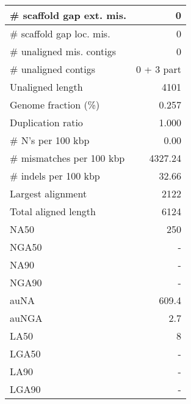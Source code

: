 \documentclass[12pt,a4paper]{article}
\begin{document}
\begin{table}[ht]
\begin{center}
\begin{tabular}{|l*{1}{|r}|}
\# scaffold gap ext. mis. & 0 \\ \hline
\# scaffold gap loc. mis. & 0 \\ \hline
\# unaligned mis. contigs & 0 \\ \hline
\# unaligned contigs & 0 + 3 part \\ \hline
Unaligned length & 4101 \\ \hline
Genome fraction (\%) & 0.257 \\ \hline
Duplication ratio & 1.000 \\ \hline
\# N's per 100 kbp & 0.00 \\ \hline
\# mismatches per 100 kbp & 4327.24 \\ \hline
\# indels per 100 kbp & 32.66 \\ \hline
Largest alignment & 2122 \\ \hline
Total aligned length & 6124 \\ \hline
NA50 & 250 \\ \hline
NGA50 & - \\ \hline
NA90 & - \\ \hline
NGA90 & - \\ \hline
auNA & 609.4 \\ \hline
auNGA & 2.7 \\ \hline
LA50 & 8 \\ \hline
LGA50 & - \\ \hline
LA90 & - \\ \hline
LGA90 & - \\ \hline
\end{tabular}
\end{center}
\end{table}
\end{document}
